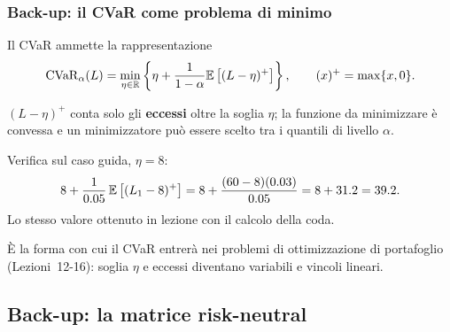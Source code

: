 \begin{frame}%
%

\frametitle{Back-up: il CVaR come problema di minimo}%
%

%


Il CVaR ammette la rappresentazione
\[
\operatorname{CVaR}_{\alpha}(L) = \min_{\eta\in\mathbb{R}} \left\{  \eta+ \frac{1}{1-\alpha}
\mathbb{E}\left[  (L-\eta)^{+}\right]  \right\}  , \qquad(x)^{+}=\max\{x,0\}.
\]


\medskip

\begin{stepitemize}
\item $(L-\eta)^{+}$ conta solo gli \textbf{eccessi} oltre la soglia $\eta$;
la funzione da minimizzare \`{e} convessa e un minimizzatore pu\`{o} essere
scelto tra i quantili di livello $\alpha$.

\item Verifica sul caso guida, $\eta=8$:
\[
8+\frac{1}{0.05}\,\E\left[  (L_{1}-8)^{+}\right]  = 8+\frac{(60-8)(0.03)}%
{0.05} = 8+31.2 = 39.2.
\]
Lo stesso valore ottenuto in lezione con il calcolo della coda.

\item \`{E} la forma con cui il CVaR entrer\`{a} nei problemi di
ottimizzazione di portafoglio (Lezioni~12-16): soglia $\eta$ e eccessi
diventano variabili e vincoli lineari.
\end{stepitemize}

%

\transboxout
\end{frame}%




\subsection{Back-up: la matrice risk-neutral}%


